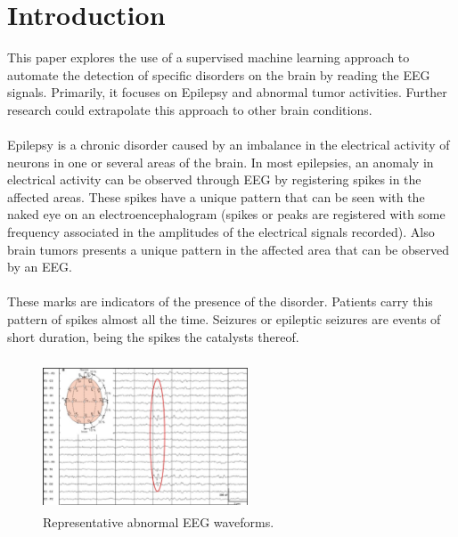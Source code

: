 \documentclass{llncs}       %
\begin{document}
\section{Introduction}
\label{intro}

This paper explores the use of a supervised machine learning approach to automate the detection of specific disorders on the brain by reading the EEG signals. Primarily, it focuses on Epilepsy and abnormal tumor activities.  Further research could extrapolate this approach to other brain conditions.

\paragraph{}
Epilepsy is a chronic disorder caused by an imbalance in the electrical activity of neurons in one or several areas of the brain. In most epilepsies, an anomaly in electrical activity can be observed through EEG by registering spikes in the affected areas.  These spikes have a unique pattern that can be seen with the naked eye on an electroencephalogram (spikes or peaks are registered with some frequency associated in the amplitudes of the electrical signals recorded).  Also brain tumors presents a unique pattern in the affected area that can be observed by an EEG.

\paragraph{}
These marks are indicators of the presence of the disorder. Patients carry this pattern of spikes almost all the time. Seizures or epileptic seizures are events of short duration, being the spikes the catalysts thereof.
\paragraph{}

\begin{figure}[h]
\centering
\includegraphics[width=6.08cm,height=4.36cm]{media/eeg-spike.eps}
\caption{Representative abnormal EEG waveforms.}
\end{figure}
\end{document}
